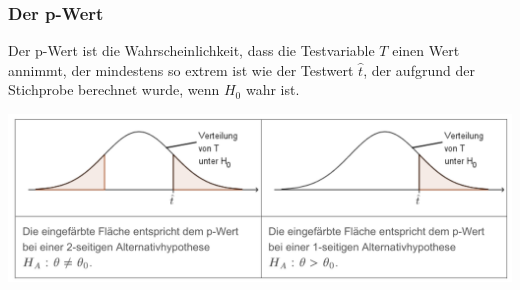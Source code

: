 \subsubsection{Der p-Wert}
\label{sec:der_p-wert}
Der p-Wert ist die Wahrscheinlichkeit, dass die Testvariable $T$ einen Wert annimmt, der mindestens so extrem ist wie der Testwert $\hat{t}$, 
der aufgrund der Stichprobe berechnet wurde, wenn $H_0$ wahr ist.
\begin{center}
    \includegraphics[width=1\linewidth]{images/p-wert}
\end{center}